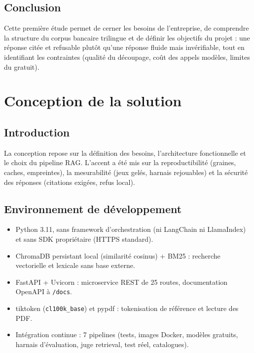 \documentclass[a4paper,12pt]{report}
\begin{document}
\section{Conclusion}
Cette premi\`ere \'etude permet de cerner les besoins de l'entreprise, de comprendre la structure du corpus bancaire trilingue et de d\'efinir les objectifs du projet : une r\'eponse cit\'ee et refusable plut\^ot qu'une r\'eponse fluide mais inv\'erifiable, tout en identifiant les contraintes (qualit\'e du d\'ecoupage, co\^ut des appels mod\`eles, limites du gratuit).

\chapter{Conception de la solution}
\section{Introduction}
La conception repose sur la d\'efinition des besoins, l'architecture fonctionnelle et le choix du pipeline RAG. L'accent a \'et\'e mis sur la reproductibilit\'e (graines, caches, empreintes), la mesurabilit\'e (jeux gel\'es, harnais rejouables) et la s\'ecurit\'e des r\'eponses (citations exig\'ees, refus local).

\section{Environnement de d\'eveloppement}
\begin{itemize}
    \item Python 3.11, sans framework d'orchestration (ni LangChain ni LlamaIndex) et sans SDK propri\'etaire (HTTPS standard).
    \item ChromaDB persistant local (similarit\'e cosinus) + BM25 : recherche vectorielle et lexicale sans base externe.
    \item FastAPI + Uvicorn : microservice REST de 25 routes, documentation OpenAPI \`a \texttt{/docs}.
    \item tiktoken (\texttt{cl100k\_base}) et pypdf : tokenisation de r\'ef\'erence et lecture des PDF.
    \item Int\'egration continue : 7 pipelines (tests, images Docker, mod\`eles gratuits, harnais d'\'evaluation, juge retrieval, test r\'eel, catalogues).
\end{itemize}
\end{document}

